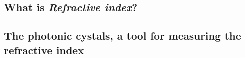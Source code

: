 \subsection{What is \textit{Refractive index}?}
\subsection{The photonic cystals, a tool for measuring the refractive index}